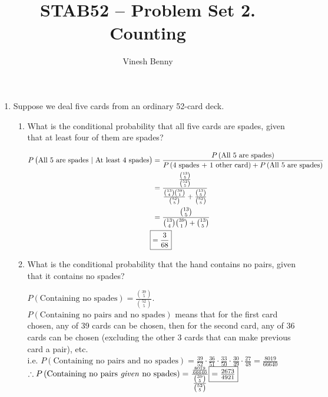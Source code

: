 \documentclass[11pt]{article}
\title{STAB52 -- Problem Set 2. Counting}
\author{Vinesh Benny}
\begin{document}
\begin{enumerate}
	\item Suppose we deal five cards from an ordinary 52-card deck.
	\begin{enumerate}
		\item What is the conditional probability that all five cards are spades, given that at least four of them are spades?
			\begin{mdframed}
				\begin{align*}
					P\left( \text{All 5 are spades } | \text{ At least 4 spades} \right) &= \frac{P\left( \text{All 5 are spades} \right)}{P\left( \text{4 spades + 1 other card} \right) + P\left( \text{All 5 are spades} \right)}\\
					&= \frac{ \frac{\binom{13}{5}}{\binom{52}{5}} }{ \frac{\binom{13}{4}  \binom{39}{1}}{\binom{52}{5}} + \frac{ \binom{13}{5}}{\binom{52}{5}} }\\
					&= \frac{\binom{13}{5}}{\binom{13}{4}  \binom{39}{1} + \binom{13}{5}}\\
					\Aboxed{&= \frac{3}{68}}
				\end{align*}
			\end{mdframed}
		\item What is the conditional probability that the hand contains no pairs, given that it contains no spades?
			\begin{mdframed}
				$ P\left( \text{Containing no spades} \right) = \frac{\binom{39}{5}}{\binom{52}{5}}$. $ P\left( \text{Containing no pairs and no spades} \right) $ means that for the first card chosen, any of 39 cards can be chosen, then for the second card, any of 36 cards can be chosen (excluding the other 3 cards that can make previous card a pair), etc.\\
				i.e. $ P\left( \text{Containing no pairs and no spades} \right) = \frac{39}{52} \cdot \frac{36}{51} \cdot \frac{33}{50} \cdot \frac{30}{49} \cdot \frac{27}{48} = \frac{8019}{66640}$\\
				$ \therefore  P\left( \text{Containing no pairs \emph{given} no spades} \right) = \frac{\frac{8019}{66640}}{\frac{\binom{39}{5}}{\binom{52}{5}}} \boxed{= \tfrac{2673}{4921}}$
			\end{mdframed}
	\end{enumerate}


\end{enumerate}
\end{document}
